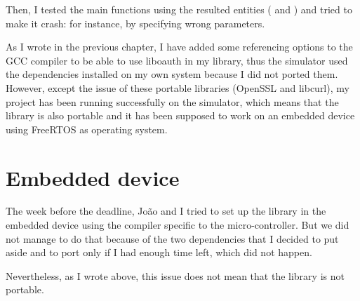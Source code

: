 Then, I tested the main functions using the resulted entities ( and ) and tried to make it crash: for instance, by specifying wrong parameters.

As I wrote in the previous chapter, I have added some referencing options to the GCC compiler to be able to use liboauth in my library, thus the simulator used the dependencies installed on my own system because I did not ported them. However, except the issue of these portable libraries (OpenSSL and libcurl), my project has been running successfully on the simulator, which means that the library is also portable and it has been supposed to work on an embedded device using FreeRTOS as operating system.


\section{Embedded device }

\hspace{15mm}The week before the deadline, Jo\~{a}o and I tried to set up the library in the embedded device using the compiler specific to the micro-controller. But we did not manage to do that because of the two dependencies that I decided to put aside and to port only if I had enough time left, which did not happen.

Nevertheless, as I wrote above, this issue does not mean that the library is not portable.



\clearpage